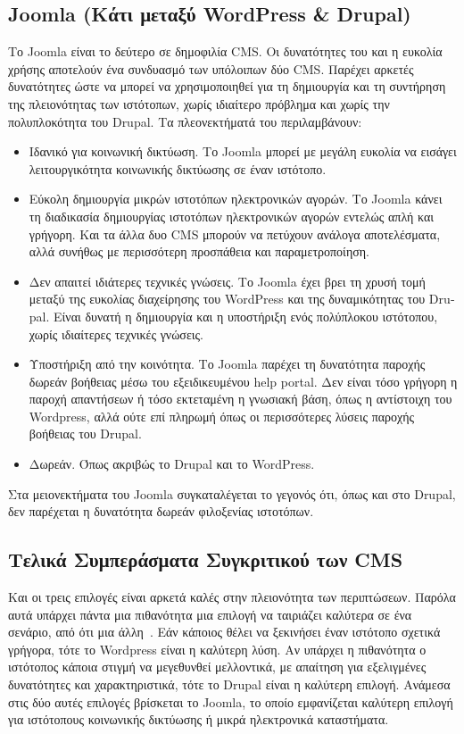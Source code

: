 \documentclass[12pt]{report}
\begin{document}
\subsection{\textlatin{Joomla} (Κάτι μεταξύ \textlatin{WordPress \& Drupal})}
Το \textlatin{Joomla} είναι το δεύτερο σε δημοφιλία \textlatin{CMS}. Οι δυνατότητες του και η ευκολία χρήσης αποτελούν ένα συνδυασμό των υπόλοιπων δύο \textlatin{CMS}. Παρέχει αρκετές δυνατότητες ώστε να μπορεί να χρησιμοποιηθεί για τη δημιουργία και τη συντήρηση της πλειονότητας των ιστότοπων, χωρίς ιδιαίτερο πρόβλημα και χωρίς την πολυπλοκότητα του \textlatin{Drupal}.
Τα πλεονεκτήματά του περιλαμβάνουν:
\begin{itemize}
\item Ιδανικό για κοινωνική δικτύωση. Το \textlatin{Joomla} μπορεί με μεγάλη ευκολία να εισάγει λειτουργικότητα κοινωνικής δικτύωσης σε έναν ιστότοπο.
\item Εύκολη δημιουργία μικρών ιστοτόπων ηλεκτρονικών αγορών. Το \textlatin{Joomla} κάνει τη διαδικασία δημιουργίας ιστοτόπων ηλεκτρονικών αγορών εντελώς απλή και γρήγορη. Και τα άλλα δυο \textlatin{CMS} μπορούν να πετύχουν ανάλογα αποτελέσματα, αλλά συνήθως με περισσότερη προσπάθεια και παραμετροποίηση.
\item Δεν απαιτεί ιδιάτερες τεχνικές γνώσεις. Το \textlatin{Joomla} έχει βρει τη χρυσή τομή μεταξύ της ευκολίας διαχείρησης του \textlatin{WordPress} και της δυναμικότητας του \textlatin{Drupal}. Είναι δυνατή η δημιουργία και η υποστήριξη ενός πολύπλοκου ιστότοπου, χωρίς ιδιαίτερες τεχνικές γνώσεις.
\item Υποστήριξη από την κοινότητα. Το \textlatin{Joomla} παρέχει τη δυνατότητα παροχής δωρεάν βοήθειας μέσω του εξειδικευμένου \textlatin{help portal}. Δεν είναι τόσο γρήγορη η παροχή απαντήσεων ή τόσο εκτεταμένη η γνωσιακή βάση, όπως η αντίστοιχη του \textlatin{Wordpress}, αλλά ούτε επί πληρωμή όπως οι περισσότερες λύσεις παροχής βοήθειας του \textlatin{Drupal}.
\item Δωρεάν. Όπως ακριβώς το \textlatin{Drupal} και το \textlatin{WordPress}.
\end{itemize}

Στα μειονεκτήματα του \textlatin{Joomla} συγκαταλέγεται το γεγονός ότι, όπως και στο \textlatin{Drupal}, δεν παρέχεται η δυνατότητα δωρεάν φιλοξενίας ιστοτόπων.

\subsection{Τελικά Συμπεράσματα Συγκριτικού των \textlatin{CMS}}
Και οι τρεις επιλογές είναι αρκετά καλές στην πλειονότητα των περιπτώσεων. Παρόλα αυτά υπάρχει πάντα μια πιθανότητα μια επιλογή να ταιριάζει καλύτερα σε ένα σενάριο, από ότι μια άλλη~\cite{make_a_website_hub_2017}. Εάν κάποιος θέλει να ξεκινήσει έναν ιστότοπο σχετικά γρήγορα, τότε το \textlatin{Wordpress} είναι η καλύτερη λύση. Αν υπάρχει η πιθανότητα ο ιστότοπος κάποια στιγμή να μεγεθυνθεί μελλοντικά, με απαίτηση για εξελιγμένες δυνατότητες και χαρακτηριστικά, τότε το \textlatin{Drupal} είναι η καλύτερη επιλογή. Ανάμεσα στις δύο αυτές επιλογές βρίσκεται το \textlatin{Joomla}, το οποίο εμφανίζεται καλύτερη επιλογή για ιστότοπους κοινωνικής δικτύωσης ή μικρά ηλεκτρονικά καταστήματα.
\end{document}
